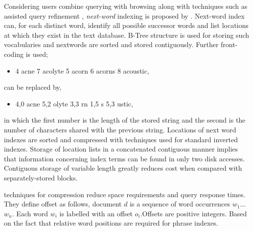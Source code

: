 Considering users combine querying with browsing along with techniques such as assisted query refinement {\citet{ag96kap}}, {\itshape next-word} indexing is proposed by {\citet{sza99adc}} . Next-word index can, for each distinct word, identify all possible successor words
and list locations at which they exist in the text database. 
B-Tree structure is used for storing such vocabularies  
and nextwords are sorted and stored contiguously. Further front-coding is used; 
\iffalse
only the characters of each word that differ from those of the previous word are stored, giving space savings. 
For example, the sequence of words
\fi
\begin{itemize}
 \item[] 4 acne 7 acolyte 5 acorn 6 acorns 8 acoustic,
\end{itemize}

can be replaced by,

\begin{itemize}
 \item[] 4,0 acne 5,2 olyte 3,3 rn 1,5 s 5,3 ustic,
\end{itemize}
in which the first number is the length of the stored string and the second is the number of characters shared with the previous string.
Locations of next word indexes are sorted and compressed with techniques 
used for standard inverted indexes. Storage of location lists in a concatenated contiguous manner
implies that information concerning index terms can be found in only two disk 
accesses. Contiguous storage of variable length greatly reduces cost when 
compared with separately-stored blocks. 



 {\citet{bwz01spi}} techniques for compression reduce space requirements and query response times. They define offset as follows,  document $d$ is a sequence of word occurrences $w$$_{1}$...$w$$_{n}$. Each word $w$$_{i}$ is labelled with an offset $o$$_{i}$.Offsets are positive integers. Based on the fact that relative word positions are required for phrase indexes.


